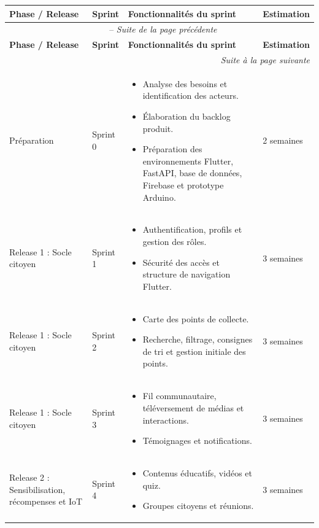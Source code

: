 \scriptsize
\begin{longtable}{|p{2.7cm}|p{1.7cm}|p{8.1cm}|p{1.7cm}|}
\hline
\rowcolor{gray!35}
\textbf{Phase / Release} & \textbf{Sprint} & \textbf{Fonctionnalités du sprint} & \textbf{Estimation} \\
\hline
\endfirsthead
\multicolumn{4}{c}{\tablename\ \thetable{} -- \textit{Suite de la page précédente}} \\
\hline
\rowcolor{gray!35}
\textbf{Phase / Release} & \textbf{Sprint} & \textbf{Fonctionnalités du sprint} & \textbf{Estimation} \\
\hline
\endhead
\hline
\multicolumn{4}{r}{\textit{Suite à la page suivante}} \\
\endfoot
\hline
\endlastfoot
Préparation & Sprint 0 & \begin{itemize}\item Analyse des besoins et identification des acteurs.\item Élaboration du backlog produit.\item Préparation des environnements Flutter, FastAPI, base de données, Firebase et prototype Arduino.\end{itemize} & 2 semaines \\
\hline
Release 1 : Socle citoyen & Sprint 1 & \begin{itemize}\item Authentification, profils et gestion des rôles.\item Sécurité des accès et structure de navigation Flutter.\end{itemize} & 3 semaines \\
\hline
Release 1 : Socle citoyen & Sprint 2 & \begin{itemize}\item Carte des points de collecte.\item Recherche, filtrage, consignes de tri et gestion initiale des points.\end{itemize} & 3 semaines \\
\hline
Release 1 : Socle citoyen & Sprint 3 & \begin{itemize}\item Fil communautaire, téléversement de médias et interactions.\item Témoignages et notifications.\end{itemize} & 3 semaines \\
\hline
Release 2 : Sensibilisation, récompenses et IoT & Sprint 4 & \begin{itemize}\item Contenus éducatifs, vidéos et quiz.\item Groupes citoyens et réunions.\end{itemize} & 3 semaines \\

\end{longtable}
